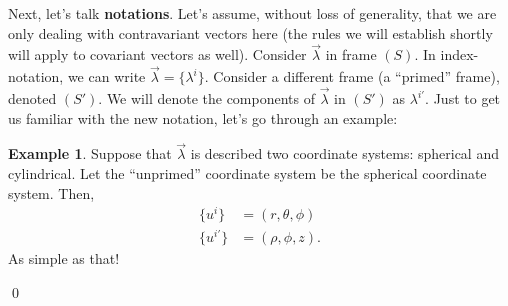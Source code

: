 \documentclass{book}
\theoremstyle{definition}
\newtheorem{exmp}{Example}[section]
\begin{document}
Next, let's talk \textbf{notations}. Let's assume, without loss of generality, that we are only dealing with contravariant vectors here (the rules we will establish shortly will apply to covariant vectors as well). Consider $\vec{\lambda}$ in frame $(S)$. In index-notation, we can write $\vec{\lambda} = \{\lambda^i\}$. Consider a different frame (a ``primed'' frame), denoted $(S')$. We will denote the components of $\vec{\lambda}$ in $(S')$ as $\lambda^{i'}$. Just to get us familiar with the new notation, let's go through an example:
\begin{exmp}
Suppose that $\vec{\lambda}$ is described two coordinate systems: spherical and cylindrical. Let the ``unprimed'' coordinate system be the spherical coordinate system. Then,
\begin{align*}
\{u^i\} &= (r,\theta,\phi)\\
\{u^{i'}\} &= (\rho, \phi, z).
\end{align*}
As simple as that!
\end{exmp}\qed
\end{document}
